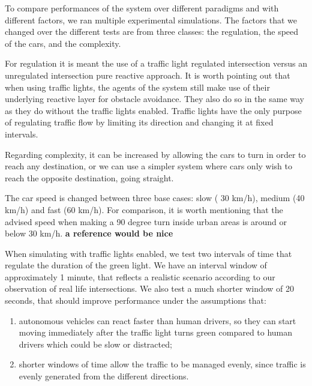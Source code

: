 

To compare performances of the system over different paradigms and with different factors, we ran
multiple experimental simulations.
The factors that we changed over the different tests are from three classes: the regulation, the speed of the cars, and the complexity.

For regulation it is meant the use of  a traffic light regulated intersection versus an unregulated intersection pure reactive approach.
It is worth pointing out that when using traffic lights, the agents of the system still make use of their underlying reactive layer for obstacle avoidance.
They also do so in the same way as they do without the traffic lights enabled.
Traffic lights have the only purpose of regulating traffic flow by limiting its direction and changing it at fixed intervals.

Regarding complexity, it can be increased by allowing the cars to turn in order to reach any destination, or we can use a simpler system where cars only wish to reach the opposite destination, going straight.

The car speed is changed between three base cases: slow ( 30 km/h), medium (40 km/h) and fast (60 km/h).
For comparison, it is worth mentioning that the advised speed when making a 90 degree turn inside urban areas is around or below 30 km/h. \textbf{a reference would be nice} %

When simulating with traffic lights enabled, we test two intervals of time that regulate the duration of the green light.
We have an interval window of approximately 1 minute, that reflects a realistic scenario according to our observation of real life intersections.
We also test a much shorter window of 20 seconds, that should improve performance under the assumptions that:
\begin{enumerate}
\item autonomous vehicles can react faster than human drivers, so they can start moving immediately after the traffic light turns green compared to human drivers which could be slow or distracted;
\item shorter windows of time allow the traffic to be managed evenly, since traffic is evenly generated from the different directions.
\end{enumerate}


